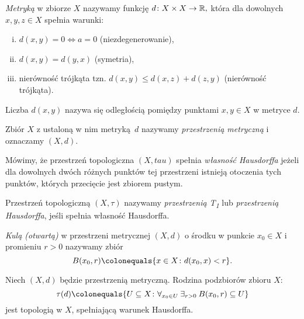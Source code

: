 {\begin{definition}
    \end{definition}
    \begin{definition}[Metryka]
        \label{def:metric}
        \emph{Metryką} w zbiorze $X$ nazywamy funkcję $d\colon X\times X\rightarrow \mathbb{R},$ która dla dowolnych $x, y, z\in X$ spełnia warunki:
        \begin{enumerate}[(i)]
            \item $d(x, y) = 0 \iff a = 0$ (niezdegenerowanie),
            \item $d(x, y) = d(y, x)$ (symetria),
            \item nierówność trójkąta tzn. $d(x, y) \leq d(x, z) + d(z, y)$ (nierówność trójkąta).
        \end{enumerate}            
    \end{definition}
    Liczba $d(x, y)$ nazywa się odległością pomiędzy punktami $x, y\in X$ w metryce $d$.
    \begin{definition}
        \label{def:metric_space}
        Zbiór $X$ z ustaloną w nim metryką~$d$ nazywamy \emph{przestrzenią metryczną} i oznaczamy $(X, d)$.
    \end{definition}
    \begin{definition}
        Mówimy, że przestrzeń topologiczna $(X, tau)$ spełnia \emph{własność Hausdorffa} jeżeli dla dowolnych dwóch różnych punktów tej przestrzeni istnieją otoczenia tych punktów, których przecięcie jest zbiorem pustym.
    \end{definition}
    \begin{definition}
        Przestrzeń topologiczną $(X, \tau)$ nazywamy \emph{przestrzenią T\textsubscript{1}} lub \emph{przestrzenią Hausdorffa}, jeśli spełnia własność Hausdorffa.
    \end{definition}
    \begin{definition}[Kula]
        \label{def:ball}
        \emph{Kulą (otwartą)} w przestrzeni metrycznej $(X, d)$ o środku w punkcie $x_0\in X$ i promieniu $r > 0$ nazywamy zbiór
        \begin{equation}
            B(x_0, r) \colonequals \{x\in X\colon d(x_0, x) < r\}.
        \end{equation}
    \end{definition}
    \begin{statement}
        Niech $(X, d)$ będzie przestrzenią metryczną. Rodzina podzbiorów zbioru $X$:
        \begin{equation}
            \tau(d) \colonequals \{U\subseteq X\colon\nforall{x_0\in U}\nexists{r>0} B(x_0, r)\subseteq U\}
        \end{equation}
        jest topologią w $X$, spełniającą warunek Hausdorffa.
    \end{statement}
}